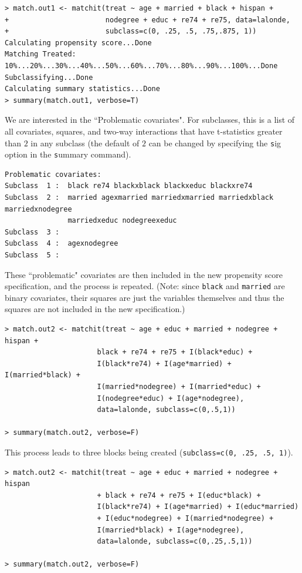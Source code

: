 \documentclass[oneside,letterpaper,titlepage]{article}
\begin{document}
\begin{verbatim}
> match.out1 <- matchit(treat ~ age + married + black + hispan +
+                       nodegree + educ + re74 + re75, data=lalonde,
+                       subclass=c(0, .25, .5, .75,.875, 1))
Calculating propensity score...Done
Matching Treated: 10%...20%...30%...40%...50%...60%...70%...80%...90%...100%...Done
Subclassifying...Done
Calculating summary statistics...Done
> summary(match.out1, verbose=T)
\end{verbatim}

We are interested in the ``Problematic covariates".  For subclasses,
this is a list of all covariates, squares, and two-way interactions
that have t-statistics greater than $2$ in any subclass (the default
of $2$ can be changed by specifying the {\texttt sig} option in the
{\texttt summary} command).

\begin{verbatim}
Problematic covariates:
Subclass  1 :  black re74 blackxblack blackxeduc blackxre74
Subclass  2 :  married agexmarried marriedxmarried marriedxblack marriedxnodegree 
               marriedxeduc nodegreexeduc
Subclass  3 :  
Subclass  4 :  agexnodegree
Subclass  5 :  
\end{verbatim}

These ``problematic" covariates are then included in the new
propensity score specification, and the process is repeated.  (Note:
since {\tt black} and {\tt married} are binary covariates, their
squares are just the variables themselves and thus the squares are not
included in the new specification.)

\begin{verbatim}
> match.out2 <- matchit(treat ~ age + educ + married + nodegree + hispan +
                      black + re74 + re75 + I(black*educ) +
                      I(black*re74) + I(age*married) + I(married*black) + 
                      I(married*nodegree) + I(married*educ) +
                      I(nodegree*educ) + I(age*nodegree),
                      data=lalonde, subclass=c(0,.5,1))

> summary(match.out2, verbose=F)
\end{verbatim}

This process leads to three blocks being created  ({\tt subclass=c(0, .25, .5, 1)}).

\begin{verbatim}
> match.out2 <- matchit(treat ~ age + educ + married + nodegree + hispan
                      + black + re74 + re75 + I(educ*black) +
                      I(black*re74) + I(age*married) + I(educ*married)
                      + I(educ*nodegree) + I(married*nodegree) +
                      I(married*black) + I(age*nodegree),
                      data=lalonde, subclass=c(0,.25,.5,1))

> summary(match.out2, verbose=F)
\end{verbatim}
\end{document}
